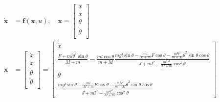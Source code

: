 \documentclass{article}
\newcommand{\matr}[1]{\bm{#1}}     %
\begin{document}
\begin{equation}
\begin{aligned}
\matr{\dot{x}} &= \matr{f}(\matr{x},u),\quad  \matr{x} = \begin{bmatrix}
	x \\
	\dot{x} \\
	\theta \\
	\dot{\theta} \\
\end{bmatrix} \\
\matr{\dot{x}} &= \begin{bmatrix}
	\dot{x} \\
	\ddot{x} \\
	\dot{\theta} \\
	\ddot{\theta} \\
\end{bmatrix} = \begin{bmatrix}
\dot{x} \\
\frac{F+ml\dot{\theta}^2\sin\theta}{M+m} -\frac{ml\cos\theta}{m+M}\frac{mgl\sin\theta- \frac{ml}{M+m} F\cos\theta -\frac{m^2l^2}{m+M}\dot{\theta}^2\sin\theta\cos\theta}{J+ml^2-\frac{m^2l^2}{M+m}\cos^2 \theta } \\[6pt]
\dot{\theta} \\
\frac{mgl\sin\theta - \frac{ml}{M+m} F\cos\theta -\frac{m^2l^2}{m+M}\dot{\theta}^2\sin\theta\cos\theta}{J+ml^2-\frac{m^2l^2}{M+m}\cos^2 \theta }
\end{bmatrix}
\end{aligned}
\end{equation}
\end{document}
